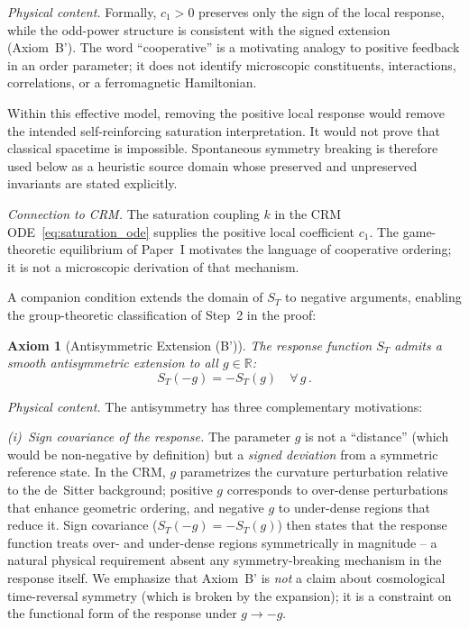 \documentclass[aps,prd,twocolumn,superscriptaddress,nofootinbib]{revtex4-2}
\newtheorem{axiom}{Axiom}
\begin{document}
\textit{Physical content.} Formally, $c_1>0$ preserves only the sign of the local response, while the odd-power structure is consistent with the signed extension (Axiom~B'). The word ``cooperative'' is a motivating analogy to positive feedback in an order parameter; it does not identify microscopic constituents, interactions, correlations, or a ferromagnetic Hamiltonian.

Within this effective model, removing the positive local response would remove the intended self-reinforcing saturation interpretation. It would not prove that classical spacetime is impossible. Spontaneous symmetry breaking is therefore used below as a heuristic source domain whose preserved and unpreserved invariants are stated explicitly.

\textit{Connection to CRM.} The saturation coupling $k$ in the CRM ODE~\eqref{eq:saturation_ode} supplies the positive local coefficient $c_1$. The game-theoretic equilibrium of Paper~I \cite{Geiger2026} motivates the language of cooperative ordering; it is not a microscopic derivation of that mechanism.

A companion condition extends the domain of $S_T$ to negative arguments, enabling the group-theoretic classification of Step~2 in the proof:

\begin{axiom}[Antisymmetric Extension (B')]
\label{ax:antisymmetry}
The response function $S_T$ admits a smooth antisymmetric extension to all $g \in \mathbb{R}$:
\begin{equation}
S_T(-g) = -S_T(g) \quad \forall\, g\,.
\label{eq:antisymmetry}
\end{equation}
\end{axiom}

\textit{Physical content.} The antisymmetry has three complementary motivations:

\textit{(i)~Sign covariance of the response.} The parameter $g$ is not a ``distance'' (which would be non-negative by definition) but a \textit{signed deviation} from a symmetric reference state. In the CRM, $g$ parametrizes the curvature perturbation relative to the de~Sitter background; positive $g$ corresponds to over-dense perturbations that enhance geometric ordering, and negative $g$ to under-dense regions that reduce it. Sign covariance ($S_T(-g) = -S_T(g)$) then states that the response function treats over- and under-dense regions symmetrically in magnitude -- a natural physical requirement absent any symmetry-breaking mechanism in the response itself. We emphasize that Axiom~B' is \textit{not} a claim about cosmological time-reversal symmetry (which is broken by the expansion); it is a constraint on the functional form of the response under $g \to -g$.
\end{document}
